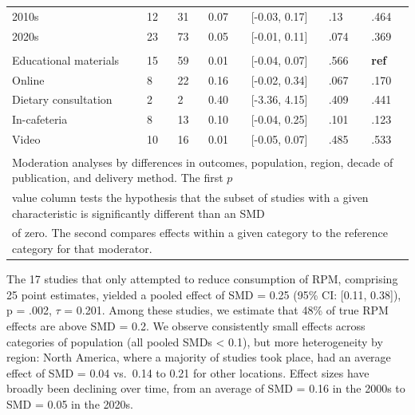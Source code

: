 \documentclass[sn-nature,referee,lineno,pdflatex]{sn-jnl}
\begin{document}
\begin{table}[!ht]
\begin{tabular}[t]{lllll>{\raggedright\arraybackslash}p{2 cm}>{\raggedright\arraybackslash}p{2 cm}}
\hspace{1em}2010s & 12 & 31 & 0.07 & {}[-0.03, 0.17] & .13 & .464\\
\hspace{1em}2020s & 23 & 73 & 0.05 & {}[-0.01, 0.11] & .074 & .369\\
\addlinespace[0.3em]
\multicolumn{7}{l}{\textbf{Method of Delivery}}\\
\hspace{1em}Educational materials & 15 & 59 & 0.01 & {}[-0.04, 0.07] & .566 & \textbf{ref}\\
\hspace{1em}Online & 8 & 22 & 0.16 & {}[-0.02, 0.34] & .067 & .170\\
\hspace{1em}Dietary consultation & 2 & 2 & 0.40 & {}[-3.36, 4.15] & .409 & .441\\
\hspace{1em}In-cafeteria & 8 & 13 & 0.10 & {}[-0.04, 0.25] & .101 & .123\\
\hspace{1em}Video & 10 & 16 & 0.01 & {}[-0.05, 0.07] & .485 & .533\\
\bottomrule
\multicolumn{7}{l}{\textsuperscript{} Moderation analyses by differences in outcomes, population, region, decade of publication, and delivery method. The first $p$}\\
\multicolumn{7}{l}{value column tests the hypothesis that the subset of studies with a given characteristic is significantly different than an SMD}\\
\multicolumn{7}{l}{of zero. The second compares effects within a given category to the reference category for that moderator.}\\
\end{tabular}
\end{table}

The 17 studies that only attempted to reduce consumption of RPM,
comprising 25 point estimates, yielded a pooled effect of SMD = 0.25
(95\% CI: {[}0.11, 0.38{]}), p = .002, \(\tau\) = 0.201. Among these
studies, we estimate that 48\% of true RPM effects are above SMD = 0.2.
We observe consistently small effects across categories of population
(all pooled SMDs \textless{} 0.1), but more heterogeneity by region:
North America, where a majority of studies took place, had an average
effect of SMD = 0.04 vs.~0.14 to 0.21 for other locations. Effect sizes
have broadly been declining over time, from an average of SMD = 0.16 in
the 2000s to SMD = 0.05 in the 2020s.
\end{document}
